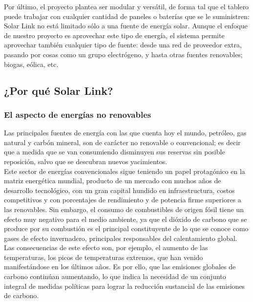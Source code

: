 Por último, el proyecto plantea ser modular y versátil, de forma tal que el tablero puede trabajar con cualquier cantidad de paneles o baterías que se le suministren: Solar Link no está limitado sólo a una fuente de energía solar. Aunque el enfoque de nuestro proyecto es aprovechar este tipo de energía, el sistema permite aprovechar también cualquier tipo de fuente: desde una red de proveedor extra, pasando por cosas como un grupo electrógeno, y hasta otras fuentes renovables; biogas, eólica, etc.\\

\subsection{¿Por qué Solar Link?}

\subsubsection{El aspecto de energías no renovables}

Las principales fuentes de energía con las que cuenta hoy el mundo, petróleo, gas natural y carbón mineral, son de carácter no renovable o convencional; es decir que a medida que se van consumiendo disminuyen sus reservas sin posible reposición, salvo que se descubran nuevos yacimientos.\\

Este sector de energías convencionales sigue teniendo un papel protagónico en la matriz energética mundial, producto de un mercado con muchos años de desarrollo tecnológico, con un gran capital hundido en infraestructura, costos competitivos y con porcentajes de rendimiento y de potencia firme superiores a las renovables. Sin embargo, el consumo de combustibles de origen fósil tiene un efecto muy negativo para el medio ambiente, ya que el dióxido de carbono que se produce por su combustión es el principal constituyente de lo que se conoce como gases de efecto invernadero, principales responsables del calentamiento global.\\

Las consecuencias de este efecto son, por ejemplo, el aumento de las temperaturas, los picos de temperaturas extremos, que han venido manifestándose en los últimos años. Es por ello, que las emisiones globales de carbono continúan aumentando, lo que indica la necesidad de un conjunto integral de medidas políticas para lograr la reducción sustancial de las emisiones de carbono.\\


